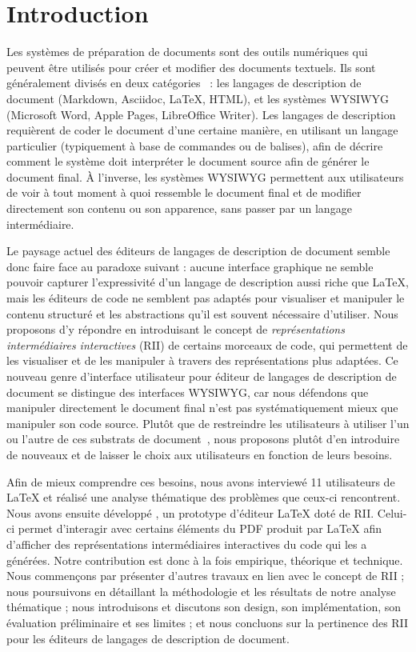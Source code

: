 \section{Introduction}
\label{sec:introduction}

Les systèmes de préparation de documents sont des outils numériques qui peuvent être utilisés pour créer et modifier des documents textuels.
Ils sont généralement divisés en deux catégories~\cite{johnson1988styles} : les langages de description de document (\eg Markdown, Asciidoc, \LaTeX{}, HTML), et les systèmes WYSIWYG (\eg Microsoft Word, Apple Pages, LibreOffice Writer).
Les langages de description requièrent de coder le document d'une certaine manière, en utilisant un langage particulier (typiquement à base de commandes ou de balises), afin de décrire comment le système doit interpréter le document source afin de générer le document final.
À l'inverse, les systèmes WYSIWYG permettent aux utilisateurs de voir à tout moment à quoi ressemble le document final et de modifier directement son contenu ou son apparence, sans passer par un langage intermédiaire.

Le paysage actuel des éditeurs de langages de description de document semble donc faire face au paradoxe suivant :
aucune interface graphique ne semble pouvoir capturer l'expressivité d'un langage de description aussi riche que \LaTeX{}, mais les éditeurs de code ne semblent pas adaptés pour visualiser et manipuler le contenu structuré et les abstractions qu'il est souvent nécessaire d'utiliser.
Nous proposons d'y répondre en introduisant le concept de \emph{représentations intermédiaires interactives} (RII) de certains morceaux de code, qui permettent de les visualiser et de les manipuler à travers des représentations plus adaptées.
Ce nouveau genre d'interface utilisateur pour éditeur de langages de description de document se distingue des interfaces WYSIWYG, car nous défendons que manipuler directement le document final n'est pas systématiquement mieux que manipuler son code source.
Plutôt que de restreindre les utilisateurs à utiliser l'un ou l'autre de ces substrats de document~\cite{beaudouin2017towards}, nous proposons plutôt d'en introduire de nouveaux et de laisser le choix aux utilisateurs en fonction de leurs besoins.

Afin de mieux comprendre ces besoins, nous avons interviewé 11 utilisateurs de \LaTeX{} et réalisé une analyse thématique des problèmes que ceux-ci rencontrent.
Nous avons ensuite développé \iLaTeX{}, un prototype d'éditeur \LaTeX{} doté de RII.
Celui-ci permet d'interagir avec certains éléments du PDF produit par \LaTeX{} afin d'afficher des représentations intermédiaires interactives du code qui les a générées.
Notre contribution est donc à la fois empirique, théorique et technique.
Nous commençons par présenter d'autres travaux en lien avec le concept de RII ;
nous poursuivons en détaillant la méthodologie et les résultats de notre analyse thématique ; nous introduisons \iLaTeX{} et discutons son design, son implémentation, son évaluation préliminaire et ses limites ;
et nous concluons sur la pertinence des RII pour les éditeurs de langages de description de document.


